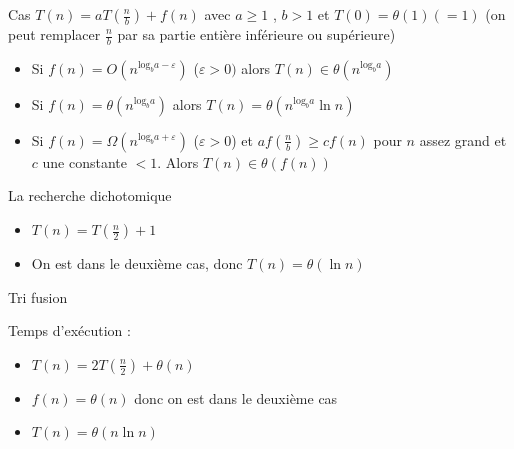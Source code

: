  Cas $T(n) = aT(\frac{n}{b}) + f(n)$ avec $a \geq 1$ , $b > 1$ et $T(0) = \theta(1) (=1)$ (on peut remplacer $\frac{n}{b}$ par sa partie entière inférieure ou supérieure) \\

\begin{itemize}
	\item Si $f(n) = O(n^{\mathrm{log}_ba-\varepsilon})$ ($\varepsilon > 0)$ alors $T(n)\in \theta(n^{\mathrm{log}_ba})$
	\item Si $f(n) = \theta(n^{\mathrm{log}_ba})$ alors $T(n) = \theta(n^{\mathrm{log}_ba}\ln n)$
	\item Si $f(n) = \Omega(n^{\mathrm{log}_ba+\varepsilon})$ ($\varepsilon > 0$) et $af(\frac{n}{b}) \geq cf(n)$ pour $n$ assez grand et $c$ une constante $< 1$. Alors $T(n) \in \theta(f(n))$
\end{itemize}

 La recherche dichotomique
\begin{itemize}
	\item $T(n) = T(\frac{n}{2}) + 1$ 
	\item On est dans le deuxième cas, donc $T(n) = \theta(\ln n)$
\end{itemize}

 Tri fusion \\

Temps d'exécution :
\begin{itemize}
	\item $T(n) = 2T(\frac{n}{2}) + \theta(n)$
	\item $f(n) = \theta(n)$ donc on est dans le deuxième cas
	\item $T(n) = \theta(n\ln n)$
\end{itemize}
